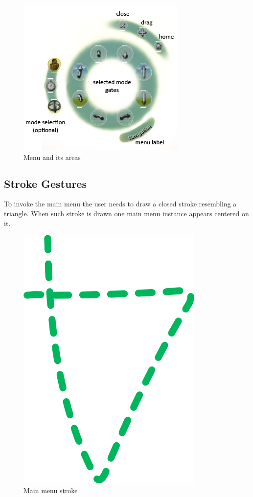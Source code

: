

\begin{figure}[ht]
	\centering
		\includegraphics[scale=0.75]{gfx/menu.png}
	\caption{Menu and its areas}
	\label{fig:menu}
\end{figure}




\subsection{Stroke Gestures}

To invoke the main menu the user needs to draw a closed stroke resembling a triangle.
When such stroke is drawn one main menu instance appears centered on it.

\begin{figure}[ht]
	\centering
		\includegraphics[scale=0.75]{gfx/triangle.png}
	\caption{Main menu stroke}
	\label{fig:triangle}
\end{figure}


